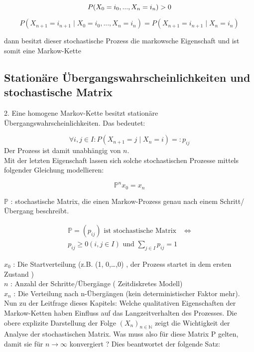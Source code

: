 \documentclass[a4paper]{article}
\begin{document}
\[
	P(X_0 = i_0, ..., X_{n} = i_{n}) > 0 \\
\] 

\[
	P(X_{n+1} = i_{n+1} \; \vert \; X_0 = i_0, ..., X_{n} = i_{n})
	= 
	P(X_{n+1} = i_{n+1} \; \vert \; X_{n} = i_{n})

\] 


dann besitzt dieser stochastische Prozess die markowsche Eigenschaft und ist somit eine Markow-Kette

\subsection{Stationäre Übergangswahrscheinlichkeiten und stochastische Matrix}

2. Eine homogene Markov-Kette besitzt stationäre Übergangswahrscheinlichkeiten. Das bedeutet:

\[
	\forall i, j \in I: P(X_{n+1} = j \; \vert \; X_n = i) =: p_{ij}
\] 
Der Prozess ist damit unabhängig von $n$.
\\

Mit der letzten Eigenschaft lassen sich solche stochastischen Prozesse mittels folgender Gleichung
modellieren:

\[
	\mathbb{P} ^{n} x_0 = x_n
\] 

$\mathbb{P}$ : stochastische Matrix, die einen Markow-Prozess genau nach einem Schritt/Übergang beschreibt.

\begin{align*}
	\mathbb{P} = \left(
		p_{ij}
	\right) \text{ ist stochastische Matrix } & \Leftrightarrow \\
	p_{ij} \geq 0 \left(
		i, j \in I
	\right) \text{ und }
	\sum_{j \in I} p_{ij} = 1
\end{align*}

$x_0$ : Die Startverteilung (z.B. (1, 0,…,0) , der Prozess startet in dem ersten Zustand ) \\
$n$ : Anzahl der Schritte/Übergänge ( Zeitdiskretes Modell) \\
$x_n$ : Die Verteilung nach n-Übergängen (kein deterministischer Faktor mehr). \\

Nun zu der Leitfrage dieses Kapitels: Welche qualitativen Eigenschaften der Markow-Ketten haben
Einfluss auf das Langzeitverhalten des Prozesses. Die obere explizite Darstellung der Folge
$(X_n)_{n\in \mathbb{N}}$ zeigt die Wichtigkeit der Analyse der stochastischen Matrix. Was muss also für diese
Matrix P gelten, damit sie für $n \rightarrow \infty$ konvergiert ? Dies beantwortet der folgende Satz:
\end{document}
